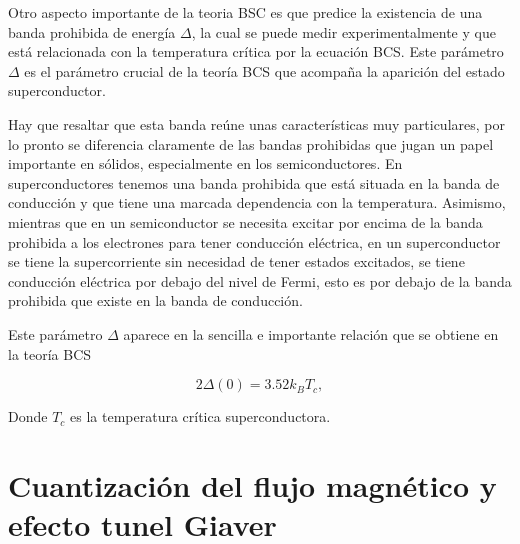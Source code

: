Otro aspecto importante de la teoria BSC es que predice la existencia de una banda prohibida de energía $\Delta$, la cual se puede medir experimentalmente y que está relacionada con la temperatura crítica por la ecuación BCS. Este parámetro $\Delta$ es el parámetro crucial de la teoría BCS que acompaña la aparición del estado superconductor.

Hay que resaltar que esta banda reúne unas características muy particulares, por lo pronto se diferencia claramente de las bandas prohibidas que jugan un papel importante en sólidos, especialmente en los semiconductores. En superconductores tenemos una banda prohibida que está situada en la banda de conducción y que tiene una marcada dependencia con la temperatura. Asimismo, mientras que en un semiconductor se necesita excitar por encima de la banda prohibida a los electrones para tener conducción eléctrica, en un superconductor se tiene la supercorriente sin necesidad de tener estados excitados, se tiene conducción eléctrica por debajo del nivel de Fermi, esto es por debajo de la banda prohibida que existe en la banda de conducción.

Este parámetro $\Delta$ aparece en la sencilla e importante relación que se obtiene en la teoría BCS

\begin{equation}
    2 \Delta(0) = 3.52 k_B T_c ,
\end{equation}

Donde $T_c$ es la temperatura crítica superconductora.

\section{Cuantización del flujo magnético y efecto tunel Giaver}

